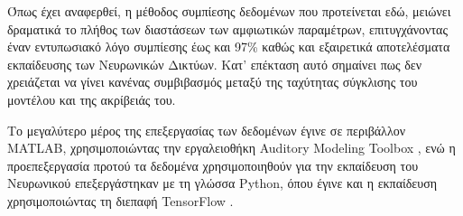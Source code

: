 Όπως έχει αναφερθεί, η μέθοδος συμπίεσης δεδομένων που προτείνεται εδώ, μειώνει δραματικά το πλήθος των διαστάσεων των αμφιωτικών παραμέτρων, επιτυγχάνοντας έναν εντυπωσιακό λόγο συμπίεσης έως και 97\% καθώς και εξαιρετικά αποτελέσματα εκπαίδευσης των Νευρωνικών Δικτύων. Κατ' επέκταση αυτό σημαίνει πως δεν χρειάζεται να γίνει κανένας συμβιβασμός μεταξύ της ταχύτητας σύγκλισης του μοντέλου και της ακρίβειάς του.

Το μεγαλύτερο μέρος της επεξεργασίας των δεδομένων έγινε σε περιβάλλον MATLAB, χρησιμοποιώντας την εργαλειοθήκη Auditory Modeling Toolbox \cite{Soendergaard2013}, ενώ η προεπεξεργασία προτού τα δεδομένα χρησιμοποιηθούν για την εκπαίδευση του Νευρωνικού επεξεργάστηκαν με τη γλώσσα Python, όπου έγινε και η εκπαίδευση χρησιμοποιώντας τη διεπαφή TensorFlow \cite{tensorflow2015-whitepaper}.